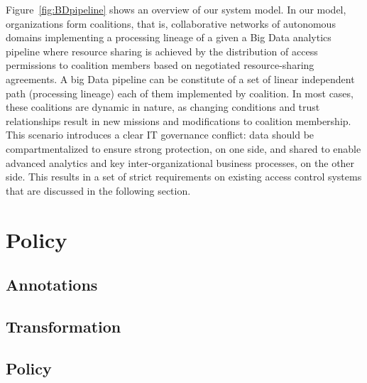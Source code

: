 Figure~\ref{fig:BDpipeline} shows an overview of our system model.
In our model, organizations form coalitions, that is, collaborative networks of autonomous domains implementing a processing lineage of a given a Big Data analytics pipeline where resource sharing is achieved by the distribution of access permissions to coalition members based on negotiated resource-sharing agreements.
A big Data pipeline can be constitute of a set of linear independent path (processing lineage) each of them implemented by coalition. In most cases, these coalitions are dynamic in nature, as changing conditions and trust relationships result in new missions and modifications to coalition membership.
This scenario introduces a clear IT governance conflict: data should be compartmentalized to ensure strong protection, on one side, and shared to enable advanced analytics and key inter-organizational business processes, on the other side.
This results in a set of strict requirements on existing access control systems that are discussed in the following section.



\section{Policy}
\subsection{Annotations}
\subsection{Transformation}
\subsection{Policy}